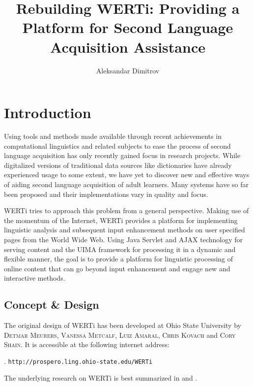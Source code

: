\documentclass[12pt]{scrartcl}
\author{Aleksandar Dimitrov}
\title{Rebuilding WERTi: Providing a Platform
for Second Language Acquisition Assistance}
\begin{document}
\maketitle

\tableofcontents


\section{Introduction}

Using tools and methods made available through recent achievements in computational
linguistics and related subjects to ease the process of second language
acquisition has only recently gained focus in research projects.  While
digitalized versions of traditional data sources like dictionaries have already
experienced usage to some extent, we have yet to discover new and
effective ways of aiding second language acquisition of adult learners. Many
systems have so far been proposed and their implementations vary in quality and
focus.

WERTi tries to approach this problem from a general perspective. Making
use of the momentum of the Internet, WERTi provides a platform for
implementing linguistic analysis and subsequent input enhancement methods on
user specified pages from the World Wide Web. Using Java Servlet and AJAX technology for
serving content and the UIMA framework for processing it in a dynamic and
flexible manner, the goal is to provide a platform for linguistic processing of
online content that can go beyond input enhancement and engage new and
interactive methods.


\subsection{Concept \& Design}

The original design of WERTi has been developed at Ohio State University by
\textsc{Detmar Meurers}, \textsc{Vanessa Metcalf}, \textsc{Luiz Amaral},
\textsc{Chris Kovach} and \textsc{Cory Shain}.
It is accessible at the following internet address:

\ex. \texttt{http://prospero.ling.ohio-state.edu/WERTi}

The underlying research on WERTi is best summarized in \cite{talk1} and \cite{talk2}.
\end{document}
